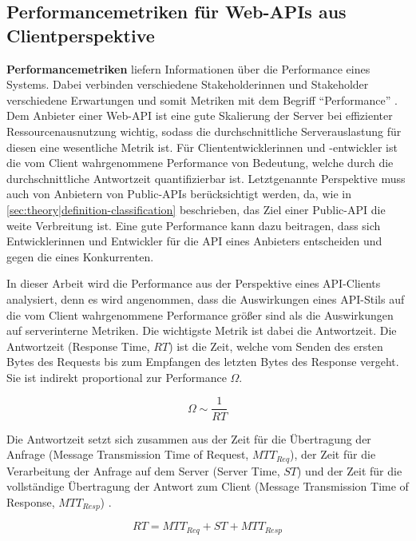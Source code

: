 \subsection[Performancemetriken für Web-APIs]{Performancemetriken für Web-APIs aus Clientperspektive}
\textbf{Performancemetriken} liefern Informationen über die Performance eines Systems. Dabei verbinden verschiedene Stakeholderinnen und Stakeholder verschiedene Erwartungen und somit Metriken mit dem Begriff \enquote{Performance} \autocite[S.~23]{Bondi2015}. Dem Anbieter einer Web-API ist eine gute Skalierung der Server bei effizienter Ressourcenausnutzung wichtig, sodass die durchschnittliche Serverauslastung für diesen eine wesentliche Metrik ist. Für Cliententwicklerinnen und -entwickler ist die vom Client wahrgenommene Performance von Bedeutung, welche durch die durchschnittliche Antwortzeit quantifizierbar ist. Letztgenannte Perspektive muss auch von Anbietern von Public-APIs berücksichtigt werden, da, wie in \cref{sec:theory|definition-classification} beschrieben, das Ziel einer Public-API die weite Verbreitung ist. Eine gute Performance kann dazu beitragen, dass sich Entwicklerinnen und Entwickler für die API eines Anbieters entscheiden und gegen die eines Konkurrenten.

\para{}In dieser Arbeit wird die Performance aus der Perspektive eines API-Clients analysiert, denn es wird angenommen, dass die Auswirkungen eines API-Stils auf die vom Client wahrgenommene Performance größer sind als die Auswirkungen auf serverinterne Metriken. Die wichtigste Metrik ist dabei die Antwortzeit. Die Antwortzeit (Response Time, \(RT\)) ist die Zeit, welche vom Senden des ersten Bytes des Requests bis zum Empfangen des letzten Bytes des Response vergeht. Sie ist indirekt proportional zur Performance \(\Omega\).

\begin{equation}\label{eqn:comp-criteria|performance|response-time-proportionality}
    \Omega \sim \frac{1}{RT}
\end{equation}

\noindent{}Die Antwortzeit setzt sich zusammen aus der Zeit für die Übertragung der Anfrage (Message Transmission Time of Request, \(\mathit{MTT}_{Req}\)), der Zeit für die Verarbeitung der Anfrage auf dem Server (Server Time, \(ST\)) und der Zeit für die vollständige Übertragung der Antwort zum Client (Message Transmission Time of Response, \(\mathit{MTT}_{Resp}\)) \autocite[Abs.~6.1]{Cherkasova2003}.

\begin{equation}\label{eqn:comp-criteria|performance|response-time}
    RT = \mathit{MTT}_{Req} + ST + \mathit{MTT}_{Resp}
\end{equation}

